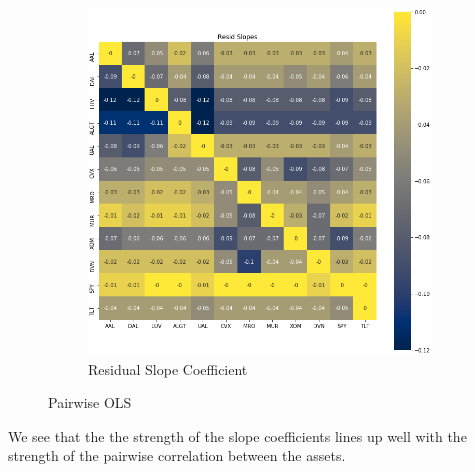 \documentclass{article}
\begin{document}
\begin{figure}[h!]
\begin{subfigure}{.5\textwidth}
    \includegraphics[width=.95\linewidth]{../Figures/pair_resid_reg_slope.png}
    \caption{Residual Slope Coefficient}
  \end{subfigure}
  \caption{Pairwise OLS}
\end{figure}
We see that the the strength of the slope coefficients lines up well with the strength of the
pairwise correlation between the assets. 
\end{document}
